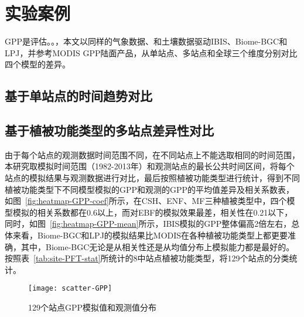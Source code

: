 \section{实验案例}
GPP是评估。。，本文以同样的气象数据、和土壤数据驱动IBIS、Biome-BGC和LPJ，并参考MODIS GPP陆面产品，从单站点、多站点和全球三个维度分别对比四个模型的差异。
\subsection{基于单站点的时间趋势对比}


\subsection{基于植被功能类型的多站点差异性对比}
由于每个站点的观测数据时间范围不同，在不同站点上不能选取相同的时间范围，本研究取模拟时间范围（1982-2013年）和观测站点的最长公共时间区间，将每个站点的模拟结果与观测数据进行对比，最后按照植被功能类型进行统计，得到不同植被功能类型下不同模型模拟的GPP和观测的GPP的平均值差异及相关系数表，如图~\ref{fig:heatmap-GPP-coef}所示，在CSH、ENF、MF三种植被类型中，四个模型模拟的相关系数都在0.6以上，而对EBF的模拟效果最差，相关性在0.21以下，同时，如图~\ref{fig:heatmap-GPP-mean}所示，IBIS模拟的GPP整体偏高2倍左右，总体来看，Biome-BGC和LPJ的模拟结果比MODIS在各种植被功能类型上都更要准确，其中，Biome-BGC无论是从相关性还是从均值分布上模拟能力都是最好的。
按照表~\ref{tab:site-PFT-stat}所统计的8中站点植被功能类型，将129个站点的分类统计。

\begin{figure}[!htbp]
    \centering
    \texttt{[image: scatter-GPP]}
    \caption{129个站点GPP模拟值和观测值分布}
    \label{fig:api-gateway-children}
\end{figure}


